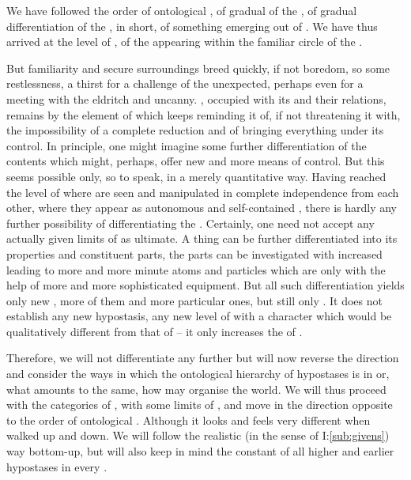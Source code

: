 We have followed the order of ontological , of gradual
 of the  , of gradual
differentiation of the , in short, of something emerging out of
. We have thus arrived at the level of 
, of the  appearing within the familiar
circle of the \hoa.

But familiarity and secure surroundings breed quickly, if not boredom, so some
restlessness, a thirst for a challenge of the unexpected, perhaps even for a
meeting with the eldritch and uncanny. , occupied with its
 and their relations, remains  by the
 element of  which keeps reminding it of, if not
threatening it with, the impossibility of a complete reduction and of bringing
everything under its control. In principle, one might imagine some
further differentiation of the  contents which might, perhaps,
offer new and more  means of control. But this seems possible only,
so to speak, in a merely quantitative way. Having reached the level of
 where  are seen and manipulated in
complete independence from each other, where they appear as autonomous and
self-contained , there is hardly any further possibility of
differentiating the . Certainly, one need not accept any actually
given limits of  as ultimate. A thing can be further
differentiated into its properties and constituent parts, the parts can be
investigated with increased  leading to more and more minute atoms
and particles which are  only with the help of more and more
sophisticated equipment. But all such differentiation yields only new
, more of them and more particular ones, but still only
. It does not establish any new hypostasis, any new level of
 with a character which would be qualitatively different from
that of  -- it only increases the  of
.

Therefore, we will not differentiate any further but will now reverse the
direction and consider the ways in which the ontological hierarchy of hypostases
is  in  or, what amounts to the same, how
 may organise the world.  We will thus proceed with the
categories of , with some limits of , and move
in the direction opposite to the order of ontological . Although
it looks and feels very different when walked up and down. We will follow the
realistic (in the sense of I:\ref{sub:givens}) way bottom-up, but will also keep
in mind the constant  of all higher and earlier hypostases in every
.

